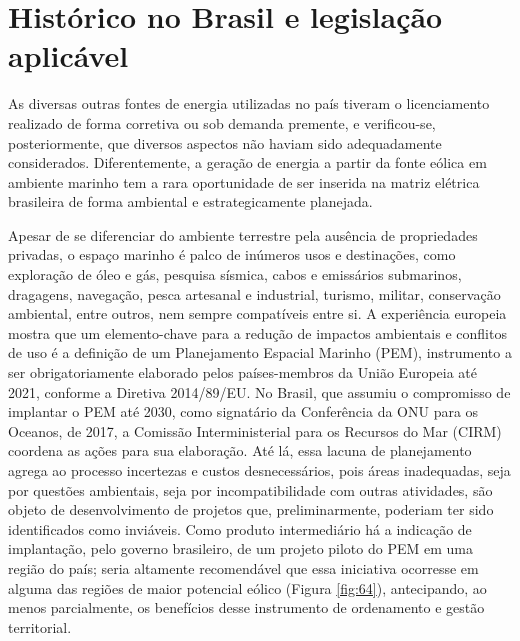 \documentclass[
  oneside]{scrbook}
\begin{document}
\hypertarget{histuxf3rico-no-brasil-e-legislauxe7uxe3o-aplicuxe1vel}{%
\section{Histórico no Brasil e legislação aplicável}\label{histuxf3rico-no-brasil-e-legislauxe7uxe3o-aplicuxe1vel}}

As diversas outras fontes de energia utilizadas no país tiveram o licenciamento realizado de forma corretiva ou sob demanda premente, e verificou-se, posteriormente, que diversos aspectos não haviam sido adequadamente considerados. Diferentemente, a geração de energia a partir da fonte eólica em ambiente marinho tem a rara oportunidade de ser inserida na matriz elétrica brasileira de forma ambiental e estrategicamente planejada.

Apesar de se diferenciar do ambiente terrestre pela ausência de propriedades privadas, o espaço marinho é palco de inúmeros usos e destinações, como exploração de óleo e gás, pesquisa sísmica, cabos e emissários submarinos, dragagens, navegação, pesca artesanal e industrial, turismo, militar, conservação ambiental, entre outros, nem sempre compatíveis entre si. A experiência europeia mostra que um elemento-chave para a redução de impactos ambientais e conflitos de uso é a definição de um Planejamento Espacial Marinho (PEM), instrumento a ser obrigatoriamente elaborado pelos países-membros da União Europeia até 2021, conforme a Diretiva 2014/89/EU. No Brasil, que assumiu o compromisso de implantar o PEM até 2030, como signatário da Conferência da ONU para os Oceanos, de 2017, a Comissão Interministerial para os Recursos do Mar (CIRM) coordena as ações para sua elaboração. Até lá, essa lacuna de planejamento agrega ao processo incertezas e custos desnecessários, pois áreas inadequadas, seja por questões ambientais, seja por incompatibilidade com outras atividades, são objeto de desenvolvimento de projetos que, preliminarmente, poderiam ter sido identificados como inviáveis. Como produto intermediário há a indicação de implantação, pelo governo brasileiro, de um projeto piloto do PEM em uma região do país; seria altamente recomendável que essa iniciativa ocorresse em alguma das regiões de maior potencial eólico (Figura \ref{fig:64}), antecipando, ao menos parcialmente, os benefícios desse instrumento de ordenamento e gestão territorial.
\end{document}
